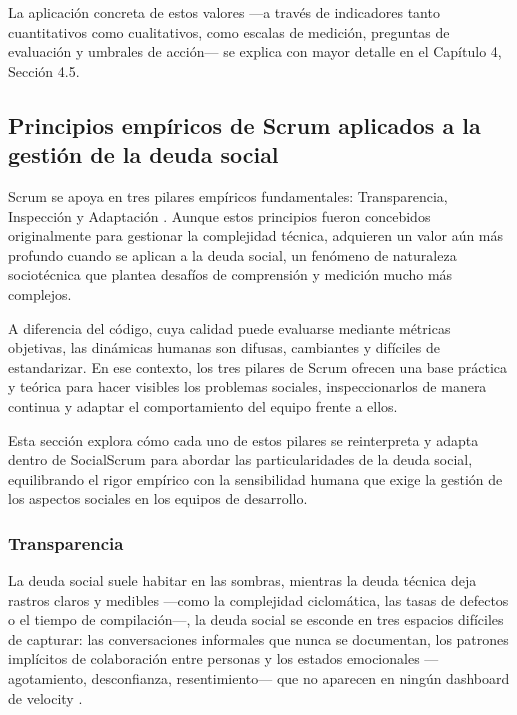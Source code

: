 La aplicación concreta de estos valores —a través de indicadores tanto cuantitativos como cualitativos, como escalas de medición, preguntas de evaluación y umbrales de acción— se explica con mayor detalle en el Capítulo 4, Sección 4.5.

\FloatBarrier

\subsection{Principios empíricos de Scrum aplicados a la gestión de la deuda social}

Scrum se apoya en tres pilares empíricos fundamentales: Transparencia, Inspección y Adaptación \cite{schwaber2020scrum}.
Aunque estos principios fueron concebidos originalmente para gestionar la complejidad técnica, adquieren un valor aún más profundo cuando se aplican a la deuda social, un fenómeno de naturaleza sociotécnica que plantea desafíos de comprensión y medición mucho más complejos.

A diferencia del código, cuya calidad puede evaluarse mediante métricas objetivas, las dinámicas humanas son difusas, cambiantes y difíciles de estandarizar.
En ese contexto, los tres pilares de Scrum ofrecen una base práctica y teórica para hacer visibles los problemas sociales, inspeccionarlos de manera continua y adaptar el comportamiento del equipo frente a ellos.

Esta sección explora cómo cada uno de estos pilares se reinterpreta y adapta dentro de SocialScrum para abordar las particularidades de la deuda social, equilibrando el rigor empírico con la sensibilidad humana que exige la gestión de los aspectos sociales en los equipos de desarrollo.

\subsubsection{Transparencia}

La deuda social suele habitar en las sombras, mientras la deuda técnica deja rastros claros y medibles —como la complejidad ciclomática, las tasas de defectos o el tiempo de compilación—, la deuda social se esconde en tres espacios difíciles de capturar:
las conversaciones informales que nunca se documentan, los patrones implícitos de colaboración entre personas y los estados emocionales —agotamiento, desconfianza, resentimiento— que no aparecen en ningún dashboard de velocity \cite{tamburri2015insights,saeeda2024nontechnicaldebt}.

